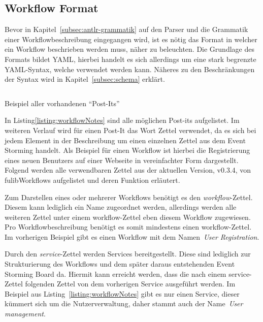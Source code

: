 \subsection{Workflow Format}\label{subsec:workflow-format}
Bevor in Kapitel~\ref{subsec:antlr-grammatik} auf den Parser und die Grammatik einer Workflowbeschreibung eingegangen wird,
ist es nötig das Format in welcher ein Workflow beschrieben werden muss, näher zu beleuchten.
Die Grundlage des Formats bildet \ac*{YAML}, hierbei handelt es sich allerdings um eine stark begrenzte YAML-Syntax, welche verwendet werden kann.
Näheres zu den Beschränkungen der Syntax wird in Kapitel~\ref{subsec:schema} erklärt.

\begin{listing}[!ht]
    \inputminted{yaml}{listings/3.1.1/allNotes.es.yaml}
    \caption{Beispiel aller vorhandenen ``Post-Its''}
    \label{listing:workflowNotes}
\end{listing}

In Listing\ref{listing:workflowNotes} sind alle möglichen Post-its aufgelistet.
Im weiteren Verlauf wird für einen Post-It das Wort Zettel verwendet, da es sich bei jedem Element in der Beschreibung um einen einzelnen Zettel aus dem Event Storming handelt.
Als Beispiel für einen Workflow ist hierbei die Registrierung eines neuen Benutzers auf einer Webseite in vereinfachter Form dargestellt.
Folgend werden alle verwendbaren Zettel aus der aktuellen Version, v0.3.4, von fulibWorkflows aufgelistet und deren Funktion erläutert.


Zum Darstellen eines oder mehrerer Workflows benötigt es den \textit{workflow}-Zettel.
Diesem kann lediglich ein Name zugeordnet werden, allerdings werden alle weiteren Zettel unter einem workflow-Zettel eben diesem Workflow zugewiesen.
Pro Workflowbeschreibung benötigt es somit mindestens einen workflow-Zettel.
Im vorherigen Beispiel gibt es einen Workflow mit dem Namen~\textit{User Registration}.


Durch den \textit{service}-Zettel werden Services bereitgestellt.
Diese sind lediglich zur Strukturierung des Workflows und dem später daraus entstehenden Event Storming Board da.
Hiermit kann erreicht werden, dass die nach einem service-Zettel folgenden Zettel von dem vorherigen Service ausgeführt werden.
Im Beispiel aus Listing~\ref{listing:workflowNotes} gibt es nur einen Service, dieser kümmert sich um die Nutzerverwaltung, daher
stammt auch der Name~\textit{User management}.

